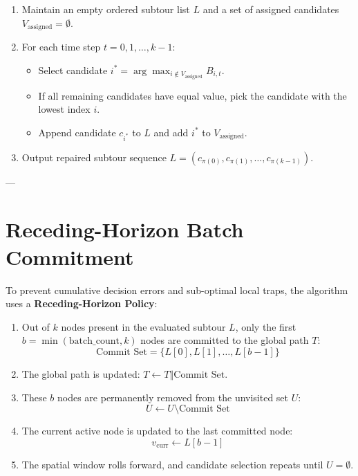 \documentclass[11pt,a4paper]{article}
\begin{document}
\begin{enumerate}
    \item Maintain an empty ordered subtour list $L$ and a set of assigned candidates $V_{\text{assigned}} = \emptyset$.
    \item For each time step $t = 0, 1, \dots, k-1$:
    \begin{itemize}
        \item Select candidate $i^* = \arg\max_{i \notin V_{\text{assigned}}} B_{i,t}$.
        \item If all remaining candidates have equal value, pick the candidate with the lowest index $i$.
        \item Append candidate $c_{i^*}$ to $L$ and add $i^*$ to $V_{\text{assigned}}$.
    \end{itemize}
    \item Output repaired subtour sequence $L = (c_{\pi(0)}, c_{\pi(1)}, \dots, c_{\pi(k-1)})$.
\end{enumerate}

---

\section{Receding-Horizon Batch Commitment}

To prevent cumulative decision errors and sub-optimal local traps, the algorithm uses a \textbf{Receding-Horizon Policy}:

\begin{enumerate}
    \item Out of $k$ nodes present in the evaluated subtour $L$, only the first $b = \min(\text{batch\_count}, k)$ nodes are committed to the global path $T$:
    \begin{equation}
    \text{Commit Set} = \{ L[0], L[1], \dots, L[b-1] \}
    \end{equation}
    \item The global path is updated: $T \leftarrow T \mathbin{\Vert} \text{Commit Set}$.
    \item These $b$ nodes are permanently removed from the unvisited set $U$:
    \begin{equation}
    U \leftarrow U \setminus \text{Commit Set}
    \end{equation}
    \item The current active node is updated to the last committed node:
    \begin{equation}
    v_{\text{curr}} \leftarrow L[b-1]
    \end{equation}
    \item The spatial window rolls forward, and candidate selection repeats until $U = \emptyset$.
\end{enumerate}
\end{document}
